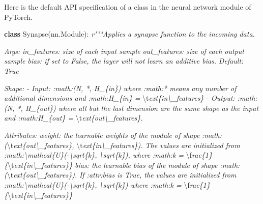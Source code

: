 \documentclass[
]{article}
\newenvironment{Shaded}{}{}
\newcommand{\CharTok}[1]{\textcolor[rgb]{0.25,0.44,0.63}{#1}}
\newcommand{\CommentTok}[1]{\textcolor[rgb]{0.38,0.63,0.69}{\textit{#1}}}
\newcommand{\KeywordTok}[1]{\textcolor[rgb]{0.00,0.44,0.13}{\textbf{#1}}}
\newcommand{\NormalTok}[1]{#1}
\begin{document}
Here is the default API specification of a class in the neural network
module of PyTorch.

\begin{Shaded}
\begin{Highlighting}[]
\KeywordTok{class}\NormalTok{ Synapse(nn.Module):}
    \CommentTok{r"""Applies a synapse function to the incoming data.\textasciigrave{}}

\CommentTok{    Args:}
\CommentTok{        in\_features:  size of each input sample}
\CommentTok{        out\_features: size of each output sample}
\CommentTok{        bias:         if set to \textasciigrave{}\textasciigrave{}False\textasciigrave{}\textasciigrave{}, the layer will not learn an additive bias.}
\CommentTok{                      Default: \textasciigrave{}\textasciigrave{}True\textasciigrave{}\textasciigrave{}}

\CommentTok{    Shape:}
\CommentTok{        {-} Input: :math:\textasciigrave{}(N, *, H\_\{in\})\textasciigrave{} where :math:\textasciigrave{}*\textasciigrave{} means any number of}
\CommentTok{             additional dimensions and :math:\textasciigrave{}H\_\{in\} = }\CharTok{\textbackslash{}t}\CommentTok{ext\{in\textbackslash{}\_features\}\textasciigrave{}}
\CommentTok{        {-} Output: :math:\textasciigrave{}(N, *, H\_\{out\})\textasciigrave{} where all but the last dimension}
\CommentTok{             are the same shape as the input and :math:\textasciigrave{}H\_\{out\} = }\CharTok{\textbackslash{}t}\CommentTok{ext\{out\textbackslash{}\_features\}\textasciigrave{}.}

\CommentTok{    Attributes:}
\CommentTok{        weight: the learnable weights of the module of shape}
\CommentTok{            	:math:\textasciigrave{}(}\CharTok{\textbackslash{}t}\CommentTok{ext\{out\textbackslash{}\_features\}, }\CharTok{\textbackslash{}t}\CommentTok{ext\{in\textbackslash{}\_features\})\textasciigrave{}. The values are}
\CommentTok{            	initialized from :math:\textasciigrave{}\textbackslash{}mathcal\{U\}({-}\textbackslash{}sqrt\{k\}, \textbackslash{}sqrt\{k\})\textasciigrave{}, where}
\CommentTok{            	:math:\textasciigrave{}k = }\CharTok{\textbackslash{}f}\CommentTok{rac\{1\}\{}\CharTok{\textbackslash{}t}\CommentTok{ext\{in\textbackslash{}\_features\}\}\textasciigrave{}}
\CommentTok{        bias:   the learnable bias of the module of shape :math:\textasciigrave{}(}\CharTok{\textbackslash{}t}\CommentTok{ext\{out\textbackslash{}\_features\})\textasciigrave{}.}
\CommentTok{                If :attr:\textasciigrave{}bias\textasciigrave{} is \textasciigrave{}\textasciigrave{}True\textasciigrave{}\textasciigrave{}, the values are initialized from}
\CommentTok{                :math:\textasciigrave{}\textbackslash{}mathcal\{U\}({-}\textbackslash{}sqrt\{k\}, \textbackslash{}sqrt\{k\})\textasciigrave{} where}
\CommentTok{                :math:\textasciigrave{}k = }\CharTok{\textbackslash{}f}\CommentTok{rac\{1\}\{}\CharTok{\textbackslash{}t}\CommentTok{ext\{in\textbackslash{}\_features\}\}\textasciigrave{}}


\end{Highlighting}
\end{Shaded}
\end{document}
